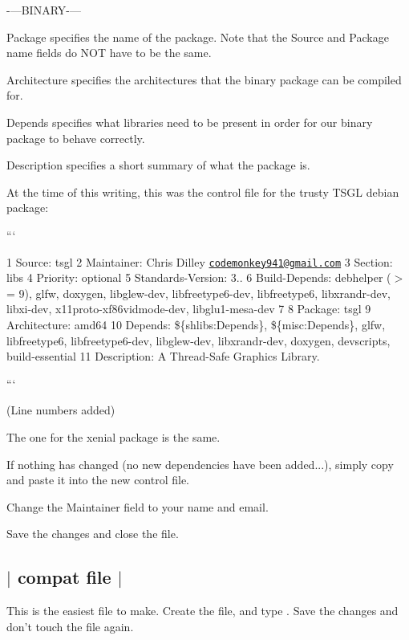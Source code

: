 -\/---B\-I\-N\-A\-R\-Y-\/---


\begin{DoxyItemize}
\item {\ttfamily Package} specifies the name of the package. Note that the Source and Package name fields do N\-O\-T have to be the same.
\item {\ttfamily Architecture} specifies the architectures that the binary package can be compiled for.
\item {\ttfamily Depends} specifies what libraries need to be present in order for our binary package to behave correctly.
\item {\ttfamily Description} specifies a short summary of what the package is.
\end{DoxyItemize}

At the time of this writing, this was the {\ttfamily control} file for the {\ttfamily trusty} T\-S\-G\-L debian package\-:

```

1 Source\-: tsgl 2 Maintainer\-: Chris Dilley \href{mailto:codemonkey941@gmail.com}{\tt codemonkey941@gmail.\-com} 3 Section\-: libs 4 Priority\-: optional 5 Standards-\/\-Version\-: 3.. 6 Build-\/\-Depends\-: debhelper ($>$= 9), glfw, doxygen, libglew-\/dev, libfreetype6-\/dev, libfreetype6, libxrandr-\/dev, libxi-\/dev, x11proto-\/xf86vidmode-\/dev, libglu1-\/mesa-\/dev 7 8 Package\-: tsgl 9 Architecture\-: amd64 10 Depends\-: \$\{shlibs\-:Depends\}, \$\{misc\-:Depends\}, glfw, libfreetype6, libfreetype6-\/dev, libglew-\/dev, libxrandr-\/dev, doxygen, devscripts, build-\/essential 11 Description\-: A Thread-\/\-Safe Graphics Library.

```

(Line numbers added)

The one for the {\ttfamily xenial} package is the same.

If nothing has changed (no new dependencies have been added...), simply copy and paste it into the new {\ttfamily control} file.

Change the {\ttfamily Maintainer} field to your name and email.

Save the changes and close the file. 

 \subsection*{$\vert$ {\ttfamily compat} file $\vert$ }

This is the easiest file to make. Create the file, and type {}. Save the changes and don't touch the file again.

